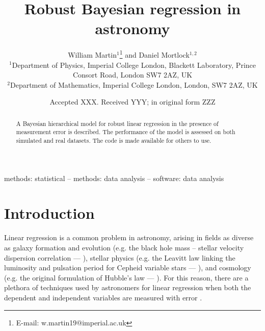 \documentclass[fleqn,usenatbib]{rasti}
\title[Robust regression in astronomy]{Robust Bayesian regression in astronomy}
\author[W. Martin \& D. Mortlock]{
William Martin$^{1}$\thanks{E-mail: w.martin19@imperial.ac.uk}
and Daniel Mortlock$^{1,2}$
\\
$^{1}$Department of Physics, Imperial College London, Blackett Laboratory, Prince Consort Road, London SW7 2AZ, UK\\
$^{2}$Department of Mathematics, Imperial College London, London, SW7 2AZ, UK
}
\date{Accepted XXX. Received YYY; in original form ZZZ}
\begin{document}
\label{firstpage}
\pagerange{\pageref{firstpage}--\pageref{lastpage}}
\maketitle

\begin{abstract}
A Bayesian hierarchical model for robust linear regression in the presence of measurement error is described.
The performance of the model is assessed on both simulated and real datasets.
The code is made available for others to use.
\end{abstract}

\begin{keywords}
methods: statistical -- methods: data analysis -- software: data analysis
\end{keywords}



\section{Introduction}
\label{sec:intro}









Linear regression is a common problem in astronomy, arising in fields as
diverse as galaxy formation and evolution (e.g. the black hole
mass -- stellar velocity dispersion correlation --- \citealt{Ferrarese:2000, Gebhardt:2000}), stellar physics (e.g. the
Leavitt law linking the luminosity and pulsation period for Cepheid variable
stars --- \citealt{Leavitt:1912}), and cosmology (e.g. the original formulation of Hubble's law --- \citealt{Hubble:1929}). For this reason, there are a plethora of techniques used by
astronomers for linear regression when both the dependent and independent
variables are measured with error \citep[e.g.][]{Press:1992, Akritas:1996,
Tremaine:2002, Kelly:2007}.
\end{document}
